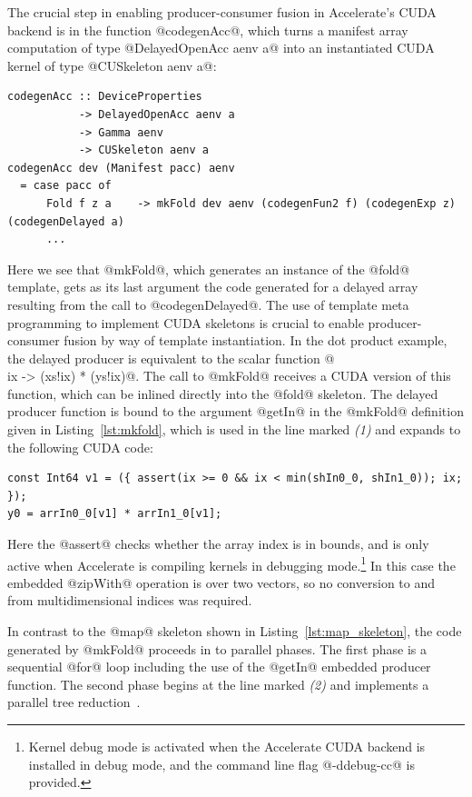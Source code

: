 The crucial step in enabling producer-consumer fusion in Accelerate's CUDA
backend is in the function @codegenAcc@, which turns a manifest array
computation of type @DelayedOpenAcc aenv a@ into an instantiated CUDA
kernel of type @CUSkeleton aenv a@:
%
\begin{lstlisting}[style=haskell]
codegenAcc :: DeviceProperties
           -> DelayedOpenAcc aenv a
           -> Gamma aenv
           -> CUSkeleton aenv a
codegenAcc dev (Manifest pacc) aenv
  = case pacc of
      Fold f z a    -> mkFold dev aenv (codegenFun2 f) (codegenExp z) (codegenDelayed a)
      ...
\end{lstlisting}
%
Here we see that @mkFold@, which generates an instance of the @fold@
template, gets as its last argument the code generated for a delayed array
resulting from the call to @codegenDelayed@. The use of template meta
programming to implement CUDA skeletons is crucial to enable producer-consumer
fusion by way of template instantiation. In the dot product example, the delayed
producer is equivalent to the scalar function @\\ix -> (xs!ix) * (ys!ix)@.
The call to @mkFold@ receives a CUDA version of this function, which can be
inlined directly into the @fold@ skeleton. The delayed producer function is
bound to the argument @getIn@ in the @mkFold@ definition given in
Listing~\ref{lst:mkfold}, which is used in the line marked \emph{(1)} and
expands to the following CUDA code:
%
\begin{lstlisting}[style=haskell]
const Int64 v1 = ({ assert(ix >= 0 && ix < min(shIn0_0, shIn1_0)); ix; });
y0 = arrIn0_0[v1] * arrIn1_0[v1];
\end{lstlisting}
%
Here the @assert@ checks whether the array index is in bounds, and is only
active when Accelerate is compiling kernels in debugging mode.\footnote{Kernel
debug mode is activated when the Accelerate CUDA backend is installed in debug
mode, and the command line flag @-ddebug-cc@ is provided.} In this case the
embedded @zipWith@ operation is over two vectors, so no conversion to and
from multidimensional indices was required.

In contrast to the @map@ skeleton shown in Listing~\ref{lst:map_skeleton},
the code generated by @mkFold@ proceeds in to parallel phases. The first
phase is a sequential @for@ loop including the use of the @getIn@
embedded producer function. The second phase begins at the line marked
\emph{(2)} and implements a parallel tree reduction~\cite{Chatterjee:2009vh}.

